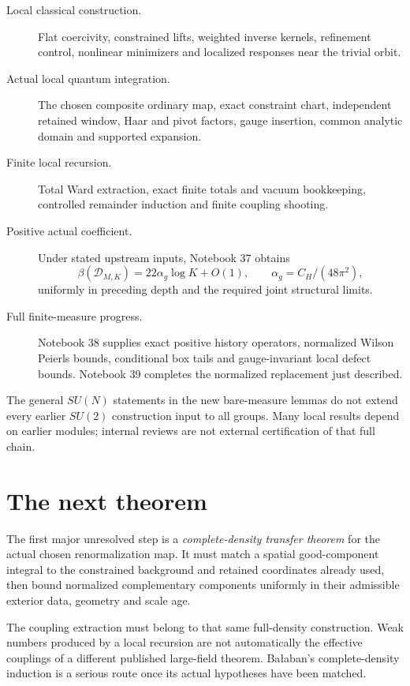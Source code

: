 \begin{description}
\item[Local classical construction.]
Flat coercivity, constrained lifts, weighted
inverse kernels, refinement control, nonlinear
minimizers and localized responses near the
trivial orbit.
\item[Actual local quantum integration.]
The chosen composite ordinary map, exact
constraint chart, independent retained window,
Haar and pivot factors, gauge insertion,
common analytic domain and supported expansion.
\item[Finite local recursion.]
Total Ward extraction, exact finite totals
and vacuum bookkeeping, controlled remainder
induction and finite coupling shooting.
\item[Positive actual coefficient.]
Under stated upstream inputs, Notebook 37
obtains
\[
 \beta(\mathcal D_{M,K})=22\alpha_g\log K+O(1),
 \qquad \alpha_g=C_H/(48\pi^2),
\]
uniformly in preceding depth and the
required joint structural limits.
\item[Full finite-measure progress.]
Notebook 38 supplies exact positive history
operators, normalized Wilson Peierls bounds,
conditional box tails and gauge-invariant
local defect bounds. Notebook 39 completes
the normalized replacement just described.
\end{description}

The general \(SU(N)\) statements in the new
bare-measure lemmas do not extend every
earlier \(SU(2)\) construction input to all
groups. Many local results depend on
earlier modules; internal reviews are not
external certification of that full chain.

\section*{The next theorem}

The first major unresolved step is a
\emph{complete-density transfer theorem}
for the actual chosen renormalization map.
It must match a spatial good-component
integral to the constrained background
and retained coordinates already used,
then bound normalized complementary
components uniformly in their admissible
exterior data, geometry and scale age.

The coupling extraction must belong to
that same full-density construction.
Weak numbers produced by a local
recursion are not automatically the
effective couplings of a different
published large-field theorem.
Ba{\l}aban's complete-density induction
is a serious route once its actual
hypotheses have been matched.

